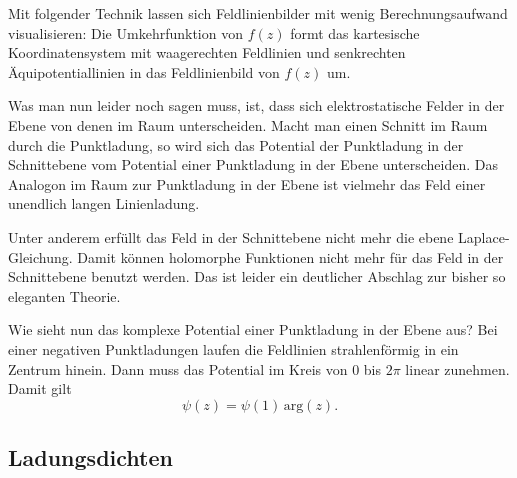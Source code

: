 \documentclass[a4paper,11pt,fleqn,twocolumn,twoside,dvipdfmx]{scrartcl}
\begin{document}
Mit folgender Technik lassen sich Feldlinienbilder mit wenig
Berechnungsaufwand visualisieren: Die Umkehrfunktion von $f(z)$
formt das kartesische Koordinatensystem mit waagerechten Feldlinien
und senkrechten Äquipotentiallinien in das Feldlinienbild
von $f(z)$ um.

Was man nun leider noch sagen muss, ist, dass sich elektrostatische
Felder in der Ebene von denen im Raum unterscheiden. Macht man
einen Schnitt im Raum durch die Punktladung, so wird sich das
Potential der Punktladung
in der Schnittebene vom Potential einer Punktladung in der Ebene
unterscheiden. Das Analogon im Raum zur Punktladung in der Ebene ist
vielmehr das Feld einer unendlich langen Linienladung.

Unter anderem erfüllt das Feld in der Schnittebene nicht mehr die
ebene Laplace-Gleichung. Damit können holomorphe Funktionen nicht mehr
für das Feld in der Schnittebene benutzt werden. Das ist leider ein
deutlicher Abschlag zur bisher so eleganten Theorie.

Wie sieht nun das komplexe Potential einer Punktladung in der Ebene
aus? Bei einer negativen Punktladungen laufen die Feldlinien
strahlenförmig in ein Zentrum hinein. Dann muss das Potential
im Kreis von $0$ bis $2\pi$ linear zunehmen. Damit
gilt
\[\psi(z) = \psi(1)\,\mathrm{arg}(z).\]

\subsection{Ladungsdichten}
\end{document}
